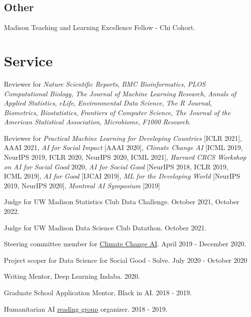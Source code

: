 \documentclass[letterpaper]{article}
\renewenvironment{itemize}{
  \begin{list}{}{
    \setlength{\leftmargin}{1.5em}
  }
}{
  \end{list}
}
\begin{document}
\subsection*{Other}
\begin{itemize}
\item Madison Teaching and Learning Excellence Fellow - Chi Cohort.
\end{itemize}

\section*{Service}

\begin{itemize}
\item Reviewer for \textit{Nature Scientific Reports}, \textit{BMC Bioinformatics}, \textit{PLOS Computational
Biology}, \textit{The Journal of Machine Learning Research}, \textit{Annals of
Applied Statistics}, \textit{eLife}, \textit{Environmental Data Science}, \textit{The R Journal},
\textit{Biometrics}, \textit{Biostatistics}, \textit{Frontiers of Computer
Science}, \textit{The Journal of the American Statistical Association},
\textit{Microbiome}, \textit{F1000 Research}.
\item Reviewer for \textit{Practical Machine Learning for Developing Countries}
  [ICLR 2021], AAAI 2021, \textit{AI for Social Impact} [AAAI 2020],
  \textit{Climate Change AI} [ICML 2019, NeurIPS 2019, ICLR 2020, NeurIPS 2020, ICML 2021],
  \textit{Harvard CRCS Workshop on AI for Social Good} 2020, \textit{AI for
    Social Good} [NeurIPS 2018, ICLR 2019, ICML 2019], \textit{AI for Good}
         [IJCAI 2019], \textit{ML for the Developing World} [NeurIPS 2019,
           NeurIPS 2020], \textit{Montreal AI Symposium} [2019]
\item Judge for UW Madison Statistics Club Data Challenge. October 2021, October 2022.
\item Judge for UW Madison Data Science Club Datathon. October 2021.
\item Steering committee member for \href{https://www.climatechange.ai}{Climate
Change AI}. April 2019 - December 2020.
\item Project scoper for Data Science for Social Good - Solve. July 2020 - October 2020
\item Writing Mentor, Deep Learning Indaba. 2020.
\item Graduate School Application Mentor, Black in AI. 2018 - 2019.
\item Humanitarian AI \href{https://krisrs1128.github.io/Humanitarian-AI/}{reading group} organizer. 2018 - 2019.

\end{itemize}
\end{document}
